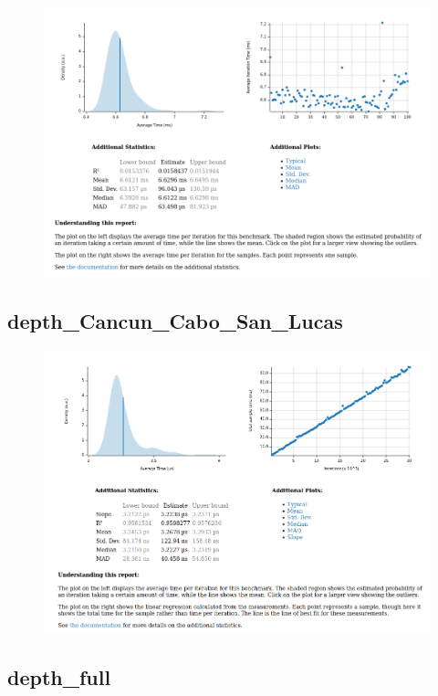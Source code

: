\begin{figure}[H]
    \centering
    \includegraphics[scale=0.4]{../img/Dijkstrak_full}
\end{figure}

\subsection{depth\_Cancun\_Cabo\_San\_Lucas}
\begin{figure}[H]
    \centering
    \includegraphics[scale=0.4]{../img/Depth_cancun}
\end{figure}

\subsection{depth\_full}

